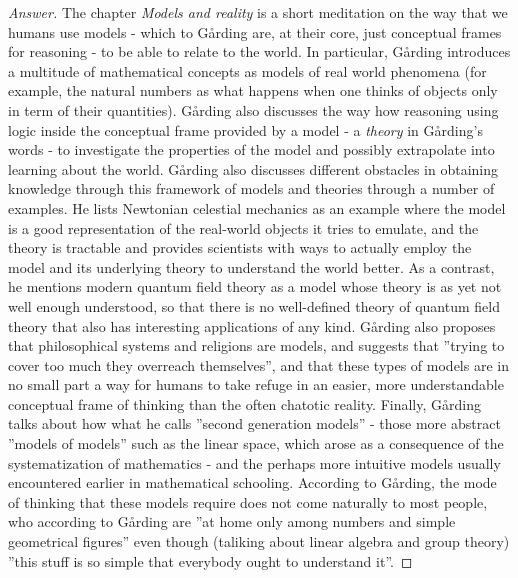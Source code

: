 \begin{proof}[Answer]
  The chapter \emph{Models and reality} is a short meditation on the way that we humans use models - which to Gårding are, at their core, just conceptual frames for reasoning - to be able to relate to the world. In particular, Gårding introduces a multitude of mathematical concepts as models of real world phenomena (for example, the natural numbers as what happens when one thinks of objects only in term of their quantities). Gårding also discusses the way how reasoning using logic inside the conceptual frame provided by a model - a \emph{theory} in Gårding's words - to investigate the properties of the model and possibly extrapolate into learning about the world. Gårding also discusses different obstacles in obtaining knowledge through this framework of models and theories through a number of examples. He lists Newtonian celestial mechanics as an example where the model is a good representation of the real-world objects it tries to emulate, and the theory is tractable and provides scientists with ways to actually employ the model and its underlying theory to understand the world better. As a contrast, he mentions modern quantum field theory as a model whose theory is as yet not well enough understood, so that there is no well-defined theory of quantum field theory that also has interesting applications of any kind. Gårding also proposes that philosophical systems and religions are models, and suggests that ''trying to cover too much they overreach themselves'', and that these types of models are in no small part a way for humans to take refuge in an easier, more understandable conceptual frame of thinking than the often chatotic reality. Finally, Gårding talks about how what he calls ''second generation models'' - those more abstract ''models of models'' such as the linear space, which arose as a consequence of the systematization of mathematics - and the perhaps more intuitive models usually encountered earlier in mathematical schooling. According to Gårding, the mode of thinking that these models require does not come naturally to most people, who according to Gårding are ''at home only among numbers and simple geometrical figures'' even though (taliking about linear algebra and group theory) ''this stuff is so simple that everybody ought to understand it''.
\vspace{11pt}


\end{proof}
